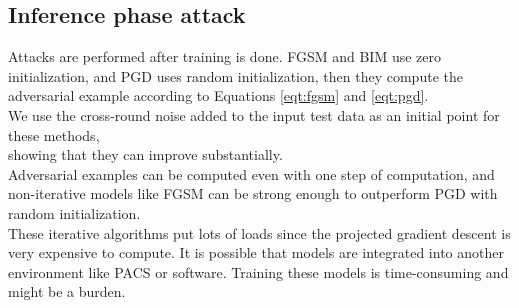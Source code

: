 \subsection{Inference phase attack}
Attacks are performed after training is done. FGSM and BIM use zero initialization, and PGD uses random initialization, then they compute the adversarial example according to Equations \ref{eqt:fgsm} and \ref{eqt:pgd}.\\
We use the cross-round noise added to the input test data as an initial point for these methods, \\



showing that they can improve substantially.\\ Adversarial examples can be computed even with one step of computation, and non-iterative models like FGSM can be strong enough to outperform PGD with random initialization.\\
These iterative algorithms put lots of loads since the projected gradient descent is very expensive to compute. \cite{shafahi2019adversarial}
It is possible that models are integrated into another environment like PACS or software. Training these models is time-consuming and might be a burden.













